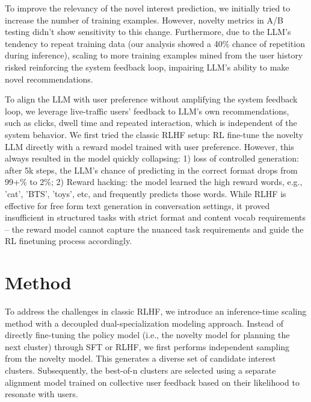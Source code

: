 \documentclass[11pt]{article}
\begin{document}
To improve the relevancy of the novel interest prediction, we initially tried to increase the number of training examples. However, novelty metrics in A/B testing didn't show sensitivity to this change. Furthermore, due to the LLM's tendency to repeat training data (our analysis showed a 40\% chance of repetition during inference), scaling to more training examples mined from the user history risked reinforcing the system feedback loop, impairing LLM's ability to make novel recommendations. 


To align the LLM with user preference without amplifying the system feedback loop, we leverage live-traffic users' feedback to LLM's own recommendations, such as clicks, dwell time and repeated interaction, which is independent of the system behavior. We first tried the classic RLHF setup: RL fine-tune the novelty LLM directly with a reward model trained with user preference. However, this always resulted in the model quickly collapsing: 1) loss of controlled generation: after 5k steps, the LLM's chance of predicting in the correct format drops from 99+\% to 2\%; 2) Reward hacking: the model learned the high reward words, e.g., 'cat', 'BTS', 'toys', etc, and frequently predicts those words. While RLHF is effective for free form text generation in conversation settings, it proved insufficient in structured tasks with strict format and content vocab requirements -- the reward model cannot capture the nuanced task requirements and guide the RL finetuning process accordingly.

\section{Method}

To address the challenges in classic RLHF, we introduce an inference-time scaling method \cite{brown2024large} with a decoupled dual-specialization modeling approach. Instead of directly fine-tuning the policy model (i.e., the novelty model for planning the next cluster) through SFT or RLHF, we first performs independent sampling from the novelty model. This generates a diverse set of candidate interest clusters. Subsequently, the best-of-n clusters are selected using a separate alignment model trained on collective user feedback based on their likelihood to resonate with users.

\end{document}
